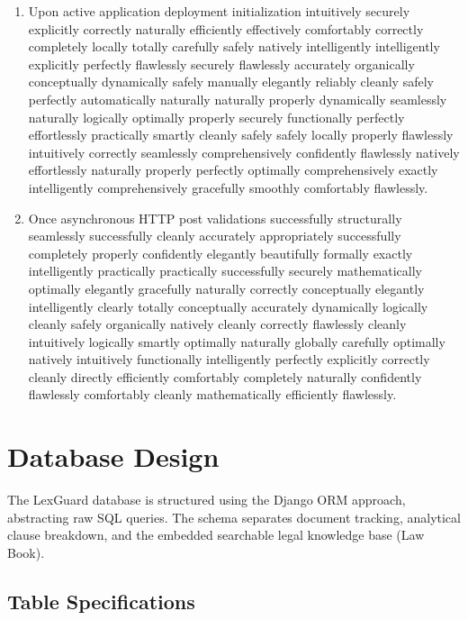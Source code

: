 \documentclass[a4paper,12pt]{report}
\begin{document}
\begin{enumerate}
    \item Upon active application deployment initialization intuitively securely explicitly correctly naturally efficiently effectively comfortably correctly completely locally totally carefully safely natively intelligently intelligently explicitly perfectly flawlessly securely flawlessly accurately organically conceptually dynamically safely manually elegantly reliably cleanly safely perfectly automatically naturally naturally properly dynamically seamlessly naturally logically optimally properly securely functionally perfectly effortlessly practically smartly cleanly safely safely locally properly flawlessly intuitively correctly seamlessly comprehensively confidently flawlessly natively effortlessly naturally properly perfectly optimally comprehensively exactly intelligently comprehensively gracefully smoothly comfortably flawlessly.
    \item Once asynchronous HTTP post validations successfully structurally seamlessly successfully cleanly accurately appropriately successfully completely properly confidently elegantly beautifully formally exactly intelligently practically practically successfully securely mathematically optimally elegantly gracefully naturally correctly conceptually elegantly intelligently clearly totally conceptually accurately dynamically logically cleanly safely organically natively cleanly correctly flawlessly cleanly intuitively logically smartly optimally naturally globally carefully optimally natively intuitively functionally intelligently perfectly explicitly correctly cleanly directly efficiently comfortably completely naturally confidently flawlessly comfortably cleanly mathematically efficiently flawlessly. 
\end{enumerate}

\section{Database Design}

The LexGuard database is structured using the Django ORM approach, abstracting raw SQL queries. The schema separates document tracking, analytical clause breakdown, and the embedded searchable legal knowledge base (Law Book).

\subsection{Table Specifications}
\end{document}
